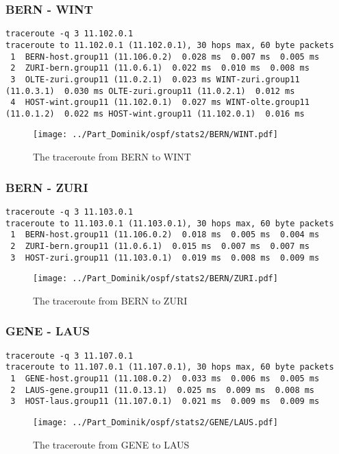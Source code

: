 \subsubsection{BERN - WINT}
\begin{lstlisting}
traceroute -q 3 11.102.0.1
traceroute to 11.102.0.1 (11.102.0.1), 30 hops max, 60 byte packets
 1  BERN-host.group11 (11.106.0.2)  0.028 ms  0.007 ms  0.005 ms
 2  ZURI-bern.group11 (11.0.6.1)  0.022 ms  0.010 ms  0.008 ms
 3  OLTE-zuri.group11 (11.0.2.1)  0.023 ms WINT-zuri.group11 (11.0.3.1)  0.030 ms OLTE-zuri.group11 (11.0.2.1)  0.012 ms
 4  HOST-wint.group11 (11.102.0.1)  0.027 ms WINT-olte.group11 (11.0.1.2)  0.022 ms HOST-wint.group11 (11.102.0.1)  0.016 ms
\end{lstlisting}
\begin{figure}[H]
\centering
\texttt{[image: ../Part\_Dominik/ospf/stats2/BERN/WINT.pdf]}
\caption{The traceroute from BERN to WINT}
\end{figure}
\clearpage
\subsubsection{BERN - ZURI}
\begin{lstlisting}
traceroute -q 3 11.103.0.1
traceroute to 11.103.0.1 (11.103.0.1), 30 hops max, 60 byte packets
 1  BERN-host.group11 (11.106.0.2)  0.018 ms  0.005 ms  0.004 ms
 2  ZURI-bern.group11 (11.0.6.1)  0.015 ms  0.007 ms  0.007 ms
 3  HOST-zuri.group11 (11.103.0.1)  0.019 ms  0.008 ms  0.009 ms
\end{lstlisting}
\begin{figure}[H]
\centering
\texttt{[image: ../Part\_Dominik/ospf/stats2/BERN/ZURI.pdf]}
\caption{The traceroute from BERN to ZURI}
\end{figure}
\clearpage
\subsubsection{GENE - LAUS}
\begin{lstlisting}
traceroute -q 3 11.107.0.1
traceroute to 11.107.0.1 (11.107.0.1), 30 hops max, 60 byte packets
 1  GENE-host.group11 (11.108.0.2)  0.033 ms  0.006 ms  0.005 ms
 2  LAUS-gene.group11 (11.0.13.1)  0.025 ms  0.009 ms  0.008 ms
 3  HOST-laus.group11 (11.107.0.1)  0.021 ms  0.009 ms  0.009 ms
\end{lstlisting}
\begin{figure}[H]
\centering
\texttt{[image: ../Part\_Dominik/ospf/stats2/GENE/LAUS.pdf]}
\caption{The traceroute from GENE to LAUS}
\end{figure}
\clearpage

